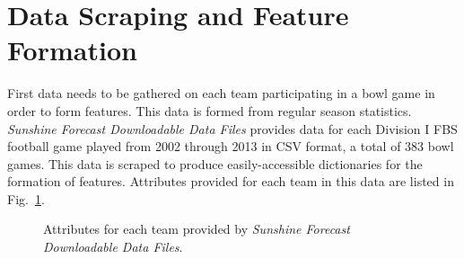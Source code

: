 \documentclass[12pt]{article}
\begin{document}
\section{Data Scraping and Feature Formation}
First data needs to be gathered on each team participating in a bowl game in order to form features. This data is formed from regular season statistics. \textit{Sunshine Forecast Downloadable Data Files} \cite{sunshine} provides data for each Division I FBS football game played from 2002 through 2013 in CSV format, a total of 383 bowl games. This data is scraped to produce easily-accessible dictionaries for the formation of features. Attributes provided for each team in this data are listed in Fig.~\ref{fig::attributes}.
\begin{figure}[ht!]
	\caption{Attributes for each team provided by \textit{Sunshine Forecast Downloadable Data Files}.}
	\label{fig::attributes}
\end{figure}
\end{document}
